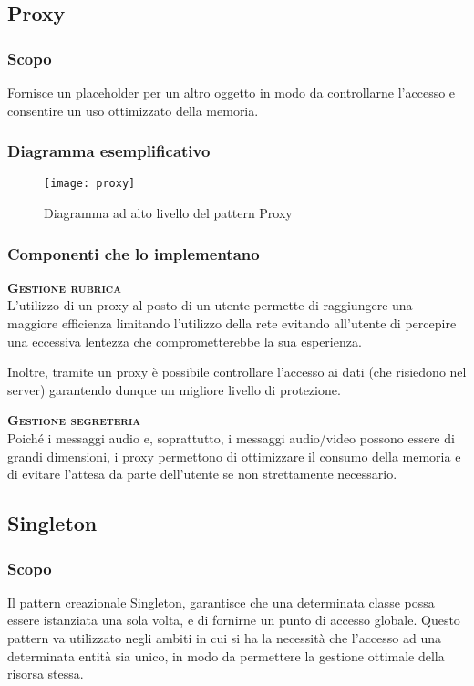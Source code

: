 \subsection{Proxy}

\subsubsection{Scopo}
Fornisce un placeholder per un altro oggetto in modo da controllarne l'accesso e consentire un uso ottimizzato della memoria.

\subsubsection{Diagramma esemplificativo}
\begin{figure}[H]
\centering
\texttt{[image: proxy]}
\caption{Diagramma ad alto livello del pattern Proxy}\label{fig:proxy}
\end{figure}

\subsubsection{Componenti che lo implementano}
\begin{description}
  \item{\bfseries\scshape Gestione rubrica}\\
L'utilizzo di un proxy al posto di un utente permette di raggiungere una maggiore efficienza limitando l'utilizzo della rete evitando all'utente di percepire una eccessiva lentezza che comprometterebbe la sua esperienza.

Inoltre, tramite un proxy è possibile controllare l'accesso ai dati (che risiedono nel server) garantendo dunque un migliore livello di protezione.
  \item{\bfseries\scshape Gestione segreteria}\\
Poiché i messaggi audio e, soprattutto, i messaggi audio/video possono essere di grandi dimensioni, i proxy permettono di ottimizzare il consumo della memoria e di evitare l'attesa da parte dell'utente se non strettamente necessario.
\end{description}

\subsection{Singleton}

\subsubsection{Scopo}
Il pattern creazionale Singleton, garantisce che una determinata classe possa essere istanziata una sola volta, e di fornirne un punto di accesso globale. Questo pattern va utilizzato negli ambiti in cui si ha la necessità che l'accesso ad una determinata entità sia unico, in modo da permettere la gestione ottimale della risorsa stessa.

